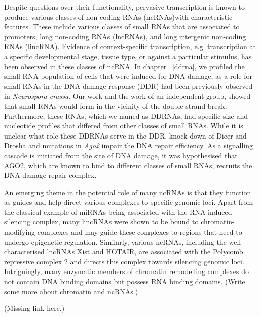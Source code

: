Despite questions over their functionality, pervasive transcription is known to produce various classes of non-coding RNAs (ncRNAs)with characteristic features. These include various classes of small RNAs that are associated to promoters\cite{pmid19920851}, long non-coding RNAs (lncRNAs)\cite{pmid24290031}, and long intergenic non-coding RNAs (lincRNA)\cite{pmid23818866}. Evidence of context-specific transcription, e.g. transcription at a specific developmental stage, tissue type, or against a particular stimulus, has been observed in these classes of ncRNA. In chapter ~\ref{ddrna}, we profiled the small RNA population of cells that were induced for DNA damage, as a role for small RNAs in the DNA damage response (DDR) had been previously observed in \textit{Neurospora crassa}\cite{pmid19444217}. Our work and the work of an independent group, showed that small RNAs would form in the vicinity of the double strand break\cite{francia2012site,pmid22445173}. Furthermore, these RNAs, which we named as DDRNAs, had specific size and nucleotide profiles that differed from other classes of small RNAs. While it is unclear what role these DDRNAs serve in the DDR, knock-down of Dicer and Drosha\cite{francia2012site} and mutations in \textit{Ago2}\cite{pmid22445173} impair the DNA repair efficiency. As a signalling cascade is initiated from the site of DNA damage\cite{pmid19847258}, it was hypothesised that AGO2, which are known to bind to different classes of small RNAs, recruits the DNA damage repair complex\cite{pmid22445173}.

An emerging theme in the potential role of many ncRNAs is that they function as guides and help direct various complexes to specific genomic loci. Apart from the classical example of miRNAs being associated with the RNA-induced silencing complex, many lincRNAs were shown to be bound to chromatin-modifying complexes and may guide these complexes to regions that need to undergo epigenetic regulation\cite{pmid19571010}. Similarly, various ncRNAs, including the well characterised lncRNAs Xist and HOTAIR, are associated with the Polycomb repressive complex 2 and directs this complex towards silencing genomic loci\cite{pmid23431328}. Intriguingly, many enzymatic members of chromatin remodelling complexes do not contain DNA binding domains but possess RNA binding domains. (Write some more about chromatin and ncRNAs.)

(Missing link here.)

